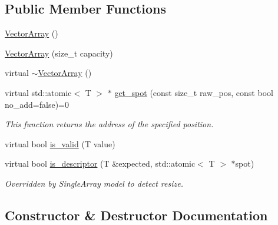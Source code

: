 \subsection*{Public Member Functions}
\begin{DoxyCompactItemize}
\item 
\hyperlink{classtervel_1_1containers_1_1wf_1_1vector_1_1_vector_array_aed082fd2b69025f00bedd363c65cf83c}{Vector\+Array} ()
\item 
\hyperlink{classtervel_1_1containers_1_1wf_1_1vector_1_1_vector_array_ac685bbc4b704949073f3ac73d8c6ade7}{Vector\+Array} (size\+\_\+t capacity)
\item 
virtual \hyperlink{classtervel_1_1containers_1_1wf_1_1vector_1_1_vector_array_aea78805a55da50a537dd0533df091db6}{$\sim$\+Vector\+Array} ()
\item 
virtual std\+::atomic$<$ T $>$ $\ast$ \hyperlink{classtervel_1_1containers_1_1wf_1_1vector_1_1_vector_array_a1ff5c1a5a86a822cfd50b48987d1857b}{get\+\_\+spot} (const size\+\_\+t raw\+\_\+pos, const bool no\+\_\+add=false)=0
\begin{DoxyCompactList}\small\item\em This function returns the address of the specified position. \end{DoxyCompactList}\item 
virtual bool \hyperlink{classtervel_1_1containers_1_1wf_1_1vector_1_1_vector_array_a46c74b691caae714a87bc93e793083f9}{is\+\_\+valid} (T value)
\item 
virtual bool \hyperlink{classtervel_1_1containers_1_1wf_1_1vector_1_1_vector_array_a03f1f7712b35cb9fc7d5f9bc4a89dd96}{is\+\_\+descriptor} (T \&expected, std\+::atomic$<$ T $>$ $\ast$spot)
\begin{DoxyCompactList}\small\item\em Overridden by Single\+Array model to detect resize. \end{DoxyCompactList}\end{DoxyCompactItemize}


\subsection{Constructor \& Destructor Documentation}
\hypertarget{classtervel_1_1containers_1_1wf_1_1vector_1_1_vector_array_aed082fd2b69025f00bedd363c65cf83c}{}
